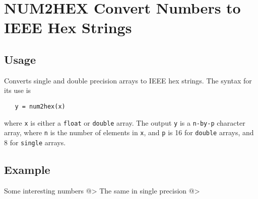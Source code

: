 \section{NUM2HEX Convert Numbers to IEEE Hex Strings}

\subsection{Usage}

Converts single and double precision arrays to IEEE hex strings.  The
syntax for its use is
\begin{verbatim}
   y = num2hex(x)
\end{verbatim}
where \verb|x| is either a \verb|float| or \verb|double| array.  The output \verb|y| is
a \verb|n-by-p| character array, where \verb|n| is the number of elements in \verb|x|,
and \verb|p| is 16 for \verb|double| arrays, and 8 for \verb|single| arrays.
\subsection{Example}

Some interesting numbers
@>
The same in single precision
@>
